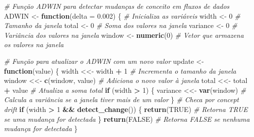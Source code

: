 \documentclass[
]{article}
\newenvironment{Shaded}{\begin{snugshade}}{\end{snugshade}}
\newcommand{\AttributeTok}[1]{\textcolor[rgb]{0.13,0.29,0.53}{#1}}
\newcommand{\CommentTok}[1]{\textcolor[rgb]{0.56,0.35,0.01}{\textit{#1}}}
\newcommand{\ConstantTok}[1]{\textcolor[rgb]{0.56,0.35,0.01}{#1}}
\newcommand{\ControlFlowTok}[1]{\textcolor[rgb]{0.13,0.29,0.53}{\textbf{#1}}}
\newcommand{\DecValTok}[1]{\textcolor[rgb]{0.00,0.00,0.81}{#1}}
\newcommand{\FloatTok}[1]{\textcolor[rgb]{0.00,0.00,0.81}{#1}}
\newcommand{\FunctionTok}[1]{\textcolor[rgb]{0.13,0.29,0.53}{\textbf{#1}}}
\newcommand{\NormalTok}[1]{#1}
\newcommand{\OtherTok}[1]{\textcolor[rgb]{0.56,0.35,0.01}{#1}}
\newcommand{\SpecialCharTok}[1]{\textcolor[rgb]{0.81,0.36,0.00}{\textbf{#1}}}
\begin{document}
\begin{Shaded}
\begin{Highlighting}[]
\CommentTok{\# Função ADWIN para detectar mudanças de conceito em fluxos de dados}
\NormalTok{ADWIN }\OtherTok{\textless{}{-}} \ControlFlowTok{function}\NormalTok{(}\AttributeTok{delta =} \FloatTok{0.002}\NormalTok{) \{}
  \CommentTok{\# Inicializa as variáveis}
\NormalTok{  width }\OtherTok{\textless{}{-}} \DecValTok{0} \CommentTok{\# Tamanho da janela}
\NormalTok{  total }\OtherTok{\textless{}{-}} \DecValTok{0} \CommentTok{\# Soma dos valores na janela}
\NormalTok{  variance }\OtherTok{\textless{}{-}} \DecValTok{0} \CommentTok{\# Variância dos valores na janela}
\NormalTok{  window }\OtherTok{\textless{}{-}} \FunctionTok{numeric}\NormalTok{(}\DecValTok{0}\NormalTok{) }\CommentTok{\# Vetor que armazena os valores na janela}
  
  \CommentTok{\# Função para atualizar o ADWIN com um novo valor}
\NormalTok{  update }\OtherTok{\textless{}{-}} \ControlFlowTok{function}\NormalTok{(value) \{}
\NormalTok{    width }\OtherTok{\textless{}\textless{}{-}}\NormalTok{ width }\SpecialCharTok{+} \DecValTok{1} \CommentTok{\# Incrementa o tamanho da janela}
\NormalTok{    window }\OtherTok{\textless{}\textless{}{-}} \FunctionTok{c}\NormalTok{(window, value) }\CommentTok{\# Adiciona o novo valor à janela}
\NormalTok{    total }\OtherTok{\textless{}\textless{}{-}}\NormalTok{ total }\SpecialCharTok{+}\NormalTok{ value }\CommentTok{\# Atualiza a soma total}
    \ControlFlowTok{if}\NormalTok{ (width }\SpecialCharTok{\textgreater{}} \DecValTok{1}\NormalTok{) \{}
\NormalTok{      variance }\OtherTok{\textless{}\textless{}{-}} \FunctionTok{var}\NormalTok{(window) }\CommentTok{\# Calcula a variância se a janela tiver mais de um valor}
\NormalTok{    \}}
    \CommentTok{\# Checa por concept drift}
    \ControlFlowTok{if}\NormalTok{ (width }\SpecialCharTok{\textgreater{}} \DecValTok{1} \SpecialCharTok{\&\&} \FunctionTok{detect\_change}\NormalTok{()) \{}
      \FunctionTok{return}\NormalTok{(}\ConstantTok{TRUE}\NormalTok{) }\CommentTok{\# Retorna TRUE se uma mudança for detectada}
\NormalTok{    \}}
    \FunctionTok{return}\NormalTok{(}\ConstantTok{FALSE}\NormalTok{) }\CommentTok{\# Retorna FALSE se nenhuma mudança for detectada}
\NormalTok{  \}}
  

\end{Highlighting}
\end{Shaded}
\end{document}
